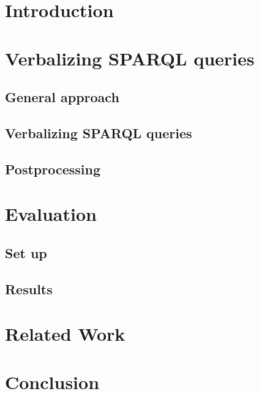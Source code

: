 \documentclass[runningheads,a4paper]{llncs}
\begin{document}
\section{Introduction}



\section{Verbalizing SPARQL queries} \label{sec:approach}

\subsection{General approach}


\subsection{Verbalizing SPARQL queries}


\subsection{Postprocessing}


\section{Evaluation} \label{sec:evaluation}

\subsection{Set up}


\subsection{Results}


\section{Related Work} \label{sec:relatedwork}



\section{Conclusion} \label{sec:conclusion}



\end{document}
